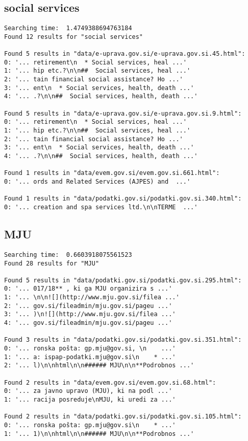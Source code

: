 \documentclass[runningheads]{llncs}
\begin{document}
\subsection{social services}
\begin{lstlisting}
Searching time:  1.4749388694763184
Found 12 results for "social services"

Found 5 results in "data/e-uprava.gov.si/e-uprava.gov.si.45.html":
0: '... retirement\n  * Social services, heal ...'
1: '... hip etc.?\n\n##  Social services, heal ...'
2: '... tain financial social assistance? Ho ...'
3: '... ent\n  * Social services, health, death ...'
4: '... .?\n\n##  Social services, health, death ...'

Found 5 results in "data/e-uprava.gov.si/e-uprava.gov.si.9.html":
0: '... retirement\n  * Social services, heal ...'
1: '... hip etc.?\n\n##  Social services, heal ...'
2: '... tain financial social assistance? Ho ...'
3: '... ent\n  * Social services, health, death ...'
4: '... .?\n\n##  Social services, health, death ...'

Found 1 results in "data/evem.gov.si/evem.gov.si.661.html":
0: '... ords and Related Services (AJPES) and  ...'

Found 1 results in "data/podatki.gov.si/podatki.gov.si.340.html":
0: '... creation and spa services ltd.\n\nTERME  ...'
\end{lstlisting}

\subsection{MJU}
\begin{lstlisting}
Searching time:  0.6603918075561523
Found 28 results for "MJU"

Found 5 results in "data/podatki.gov.si/podatki.gov.si.295.html":
0: '... 017/18** , ki ga MJU organizira s ...'
1: '... \n\n![](http://www.mju.gov.si/filea ...'
2: '... gov.si/fileadmin/mju.gov.si/pageu ...'
3: '... )\n![](http://www.mju.gov.si/filea ...'
4: '... gov.si/fileadmin/mju.gov.si/pageu ...'

Found 3 results in "data/podatki.gov.si/podatki.gov.si.351.html":
0: '... ronska pošta: gp.mju@gov.si, \n    ...'
1: '... a: ispap-podatki.mju@gov.si\n    * ...'
2: '... l)\n\nhtml\n\n###### MJU\n\n**Podrobnos ...'

Found 2 results in "data/evem.gov.si/evem.gov.si.68.html":
0: '... za javno upravo (MJU), ki na podl ...'
1: '... racija posreduje\nMJU, ki uredi za ...'

Found 2 results in "data/podatki.gov.si/podatki.gov.si.105.html":
0: '... ronska pošta: gp.mju@gov.si\n    * ...'
1: '... 1)\n\nhtml\n\n###### MJU\n\n**Podrobnos ...'
\end{lstlisting}
\end{document}
